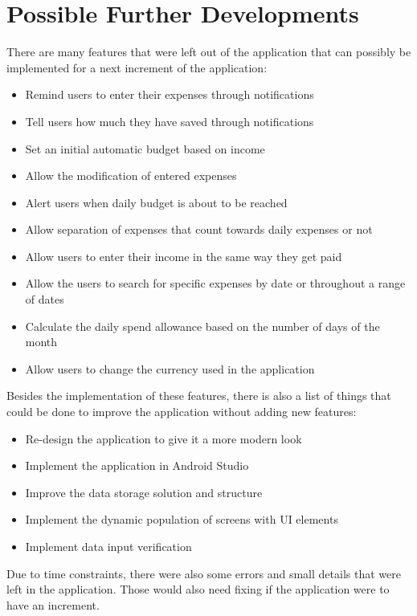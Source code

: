 \chapter{Possible Further Developments}
There are many features that were left out of the application that can possibly be implemented for a next increment of the application:

\begin{itemize}
  \item Remind users to enter their expenses through notifications
  \item Tell users how much they have saved through notifications
  \item Set an initial automatic budget based on income
  \item Allow the modification of entered expenses
  \item Alert users when daily budget is about to be reached
  \item Allow separation of expenses that count towards daily expenses or not
  \item Allow users to enter their income in the same way they get paid
  \item Allow the users to search for specific expenses by date or throughout a range of dates
  \item Calculate the daily spend allowance based on the number of days of the month
  \item Allow users to change the currency used in the application
\end{itemize}

Besides the implementation of these features, there is also a list of things that could be done to improve the application without adding new features:
\begin{itemize}
  \item Re-design the application to give it a more modern look
  \item Implement the application in Android Studio
  \item Improve the data storage solution and structure
  \item Implement the dynamic population of screens with UI elements
  \item Implement data input verification
\end{itemize}

Due to time constraints, there were also some errors and small details that were left in the application. Those would also need fixing if the application were to have an increment.

